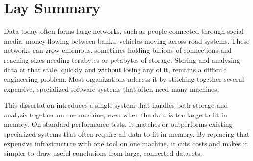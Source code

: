 \chapter{Lay Summary}
Data today often forms large networks, such as people connected through social media, money flowing between banks, vehicles moving across road systems.
These networks can grow enormous, sometimes holding billions of connections and reaching sizes needing terabytes or petabytes of storage.
Storing and analyzing data at that scale, quickly and without losing any of it, remains a difficult engineering problem.
Most organizations address it by stitching together several expensive, specialized software systems that often need many machines.

This dissertation introduces a single system that handles both storage and analysis together on one machine, even when the data is too large to fit in memory.
On standard performance tests, it matches or outperforms existing specialized systems that often require all data to fit in memory.
By replacing that expensive infrastructure with one tool on one machine, it cuts costs and makes it simpler to draw useful conclusions from large, connected datasets.